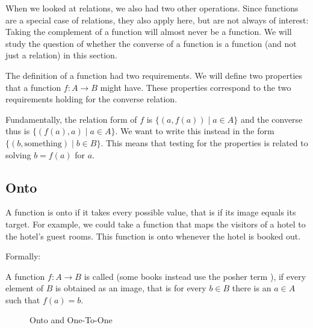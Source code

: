 When we looked at relations, we also had two other operations. Since functions are a
special case of relations, they also apply here, but are not always of interest: 
Taking the complement of a function will almost never be a function. We will study the
question of whether the converse of a function is a function (and not just a relation)
in this section.
\medskip

The definition of a function had two requirements. We will define two properties that a
function $f\colon A\to B$ might have. These properties correspond to the two requirements holding for the converse relation.

Fundamentally, the relation form of $f$ is $\{(a,f(a))\mid a\in A\}$ and the converse
thus is $\{(f(a),a)\mid a\in A\}$. We want to write this instead in
the form $\{(b,\mbox{something})\mid b\in B\}$. This means that testing for the properties
is related to solving $b=f(a)$ for $a$.

\subsection{Onto}

A function is onto if it takes every possible value, that is if its image
equals its target.
For example, we could take a function that maps the visitors of a hotel to
the hotel's guest rooms. This function is onto whenever the hotel is booked
out.

Formally:
\begin{defn}
A function $f\colon A\to B$ is called  (some books instead use the posher
term ), if every element of $B$ is obtained as an image, that is for every $b\in B$ there is an $a\in A$ such that $f(a)=b$.
\end{defn}

\begin{figure}[t]
\begin{center}
\caption{Onto and One-To-One}
\label{figoneonto}
\end{center}
\end{figure}

